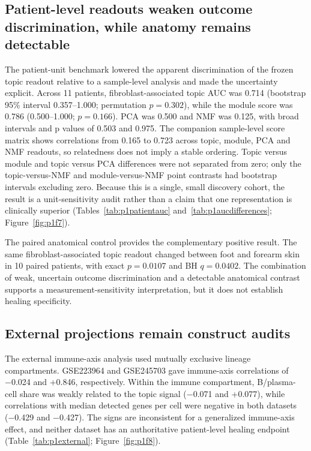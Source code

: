 

\subsection{Patient-level readouts weaken outcome discrimination, while anatomy remains detectable}

The patient-unit benchmark lowered the apparent discrimination of the frozen topic readout relative to a sample-level analysis and made the uncertainty explicit. Across 11 patients, fibroblast-associated topic AUC was 0.714 (bootstrap 95\% interval 0.357--1.000; permutation $p=0.302$), while the module score was 0.786 (0.500--1.000; $p=0.166$). PCA was 0.500 and NMF was 0.125, with broad intervals and p values of 0.503 and 0.975. The companion sample-level score matrix shows correlations from 0.165 to 0.723 across topic, module, PCA and NMF readouts, so relatedness does not imply a stable ordering. Topic versus module and topic versus PCA differences were not separated from zero; only the topic-versus-NMF and module-versus-NMF point contrasts had bootstrap intervals excluding zero. Because this is a single, small discovery cohort, the result is a unit-sensitivity audit rather than a claim that one representation is clinically superior (Tables~\ref{tab:p1patientauc} and~\ref{tab:p1aucdifferences}; Figure~\ref{fig:p1f7}\label{call:p1f7}).



The paired anatomical control provides the complementary positive result. The same fibroblast-associated topic readout changed between foot and forearm skin in 10 paired patients, with exact $p=0.0107$ and BH $q=0.0402$. The combination of weak, uncertain outcome discrimination and a detectable anatomical contrast supports a measurement-sensitivity interpretation, but it does not establish healing specificity.

\subsection{External projections remain construct audits}

The external immune-axis analysis used mutually exclusive lineage compartments. GSE223964 and GSE245703 gave immune-axis correlations of −0.024 and +0.846, respectively. Within the immune compartment, B/plasma-cell share was weakly related to the topic signal (−0.071 and +0.077), while correlations with median detected genes per cell were negative in both datasets (−0.429 and −0.427). The signs are inconsistent for a generalized immune-axis effect, and neither dataset has an authoritative patient-level healing endpoint (Table~\ref{tab:p1external}; Figure~\ref{fig:p1f8}\label{call:p1f8}).

